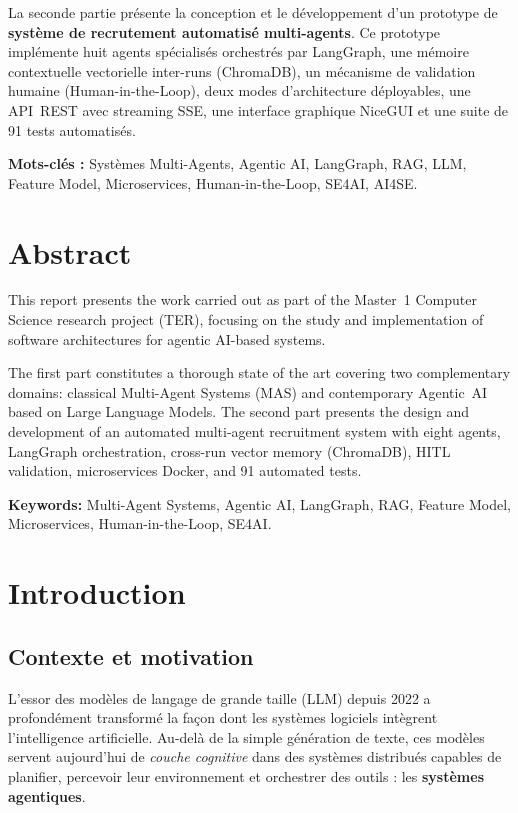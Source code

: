 \documentclass[12pt,a4paper]{report}
\begin{document}
La seconde partie présente la conception et le développement d'un prototype de
\textbf{système de recrutement automatisé multi-agents}. Ce prototype implémente
huit agents spécialisés orchestrés par LangGraph, une mémoire contextuelle
vectorielle inter-runs (ChromaDB), un mécanisme de validation humaine
(Human-in-the-Loop), deux modes d'architecture déployables, une API~REST avec
streaming SSE, une interface graphique NiceGUI et une suite de 91 tests automatisés.

\textbf{Mots-clés :} Systèmes Multi-Agents, Agentic AI, LangGraph, RAG, LLM,
Feature Model, Microservices, Human-in-the-Loop, SE4AI, AI4SE.

\chapter*{Abstract}

This report presents the work carried out as part of the Master~1 Computer Science
research project (TER), focusing on the study and implementation of software
architectures for agentic AI-based systems.

The first part constitutes a thorough state of the art covering two complementary
domains: classical Multi-Agent Systems (MAS) and contemporary Agentic~AI based on
Large Language Models. The second part presents the design and development of an
automated multi-agent recruitment system with eight agents, LangGraph orchestration,
cross-run vector memory (ChromaDB), HITL validation, microservices Docker, and
91 automated tests.

\textbf{Keywords:} Multi-Agent Systems, Agentic AI, LangGraph, RAG, Feature Model,
Microservices, Human-in-the-Loop, SE4AI.

\tableofcontents
\listoffigures
\listoftables

\chapter{Introduction}
\label{chap:intro}

\section{Contexte et motivation}

L'essor des modèles de langage de grande taille (LLM) depuis 2022 a profondément
transformé la façon dont les systèmes logiciels intègrent l'intelligence artificielle.
Au-delà de la simple génération de texte, ces modèles servent aujourd'hui de
\textit{couche cognitive} dans des systèmes distribués capables de planifier, percevoir
leur environnement et orchestrer des outils : les \textbf{systèmes agentiques}.
\end{document}
